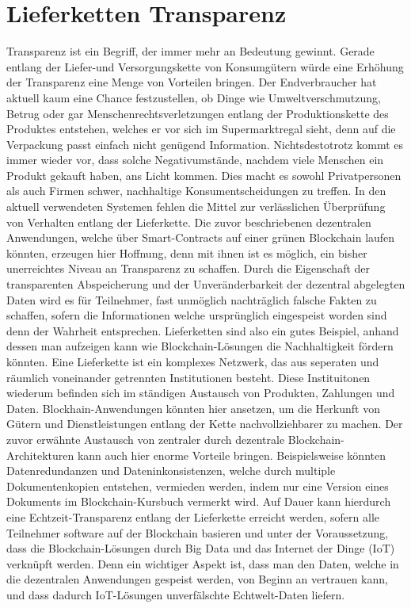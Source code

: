 \section{Lieferketten Transparenz}
Transparenz ist ein Begriff, der immer mehr an Bedeutung gewinnt. Gerade entlang der Liefer-und Versorgungskette von Konsumgütern würde eine Erhöhung der Transparenz eine Menge von Vorteilen bringen. Der Endverbraucher hat aktuell kaum eine Chance festzustellen, ob Dinge wie Umweltverschmutzung, Betrug oder gar Menschenrechtsverletzungen entlang der Produktionskette des Produktes entstehen, welches er vor sich im Supermarktregal sieht, denn auf die Verpackung passt einfach nicht genügend Information. Nichtsdestotrotz kommt es immer wieder vor, dass solche Negativumstände, nachdem viele Menschen ein Produkt gekauft haben, ans Licht kommen. Dies macht es sowohl Privatpersonen als auch Firmen schwer, nachhaltige Konsumentscheidungen zu treffen. In den aktuell verwendeten Systemen fehlen die Mittel zur verlässlichen Überprüfung von Verhalten entlang der Lieferkette. Die zuvor beschriebenen dezentralen Anwendungen, welche über Smart-Contracts auf einer grünen Blockchain laufen könnten, erzeugen hier Hoffnung, denn mit ihnen ist es möglich, ein bisher unerreichtes Niveau an Transparenz zu schaffen. Durch die Eigenschaft der transparenten Abspeicherung und der Unveränderbarkeit der dezentral abgelegten Daten wird es für Teilnehmer, fast unmöglich nachträglich falsche Fakten zu schaffen, sofern die Informationen welche ursprünglich eingespeist worden sind denn der Wahrheit entsprechen. Lieferketten sind also ein gutes Beispiel, anhand dessen man aufzeigen kann wie Blockchain-Lösungen die Nachhaltigkeit fördern könnten. Eine Lieferkette ist ein komplexes Netzwerk, das aus seperaten und räumlich voneinander getrennten Institutionen besteht. Diese Instituitonen wiederum befinden sich im ständigen Austausch von Produkten, Zahlungen und Daten. Blockhain-Anwendungen könnten hier ansetzen, um die Herkunft von Gütern und Dienstleistungen entlang der Kette nachvollziehbarer zu machen. Der zuvor erwähnte Austausch von zentraler durch dezentrale Blockchain-Architekturen kann auch hier enorme Vorteile bringen. Beispielsweise könnten Datenredundanzen und Dateninkonsistenzen, welche durch multiple Dokumentenkopien entstehen, vermieden werden, indem nur eine Version eines Dokuments im Blockchain-Kursbuch vermerkt wird. Auf Dauer kann hierdurch eine Echtzeit-Transparenz entlang der Lieferkette erreicht werden, sofern alle Teilnehmer software auf der Blockchain basieren und unter der Voraussetzung, dass die Blockchain-Lösungen durch Big Data und das Internet der Dinge (IoT) verknüpft werden. Denn ein wichtiger Aspekt ist, dass man den Daten, welche in die dezentralen Anwendungen gespeist werden, von Beginn an vertrauen kann, und dass dadurch IoT-Lösungen unverfälschte Echtwelt-Daten liefern.\newline
